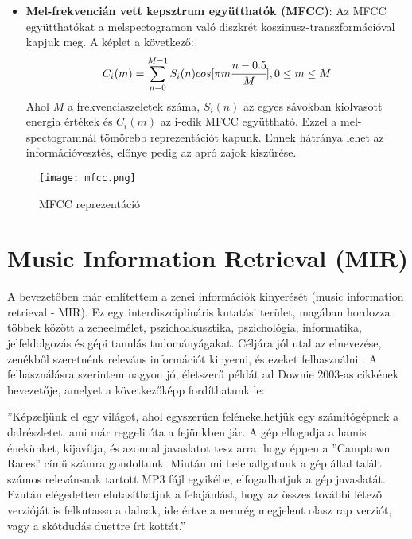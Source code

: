 \begin{itemize}
\item \textbf{Mel-frekvencián vett kepsztrum együtthatók (MFCC)}: Az MFCC együtthatókat a melspectogramon való diszkrét koszinusz-transzformációval kapjuk meg. A képlet a következő:
\begin{equation}
	C_i(m) =  \sum_{n=0}^{M-1}S_i(n) cos [\pi m\cfrac{n - 0.5}{M}], 0 \leq m \leq M
\end{equation}
Ahol \(M\) a frekvenciaszeletek száma, \(S_i(n)\) az egyes sávokban kiolvasott energia értékek és \(C_i(m)\) az i-edik MFCC együttható. Ezzel a mel-spectogramnál tömörebb reprezentációt kapunk. Ennek hátránya lehet az információvesztés, előnye pedig az apró zajok kiszűrése. \cite{bhalke2015}
\end{itemize}

\begin{figure}[H]
  \centering
  \texttt{[image: mfcc.png]}
  \caption{MFCC reprezentáció \cite{librosa}}
\end{figure}

\section{Music Information Retrieval (MIR)} 

A bevezetőben már említettem a zenei információk kinyerését (music information retrieval - MIR). Ez egy interdiszciplináris kutatási terület, magában hordozza többek között a zeneelmélet, pszichoakusztika, pszichológia, informatika, jelfeldolgozás és gépi tanulás tudományágakat. Céljára jól utal az elnevezése, zenékből szeretnénk releváns információt kinyerni, és ezeket felhasználni \cite{Choi2017}. A felhasználásra szerintem nagyon jó, életszerű példát ad Downie 2003-as cikkének \cite{Downie2003} bevezetője, amelyet a következőképp fordíthatunk le:

''Képzeljünk el egy világot, ahol egyszerűen felénekelhetjük egy számítógépnek a dalrészletet, ami már reggeli óta a fejünkben jár. A gép elfogadja a hamis énekünket, kijavítja, és azonnal javaslatot tesz arra, hogy éppen a ''Camptown Races'' című számra gondoltunk. Miután mi belehallgatunk a gép által talált számos relevánsnak tartott MP3 fájl egyikébe, elfogadhatjuk a gép javaslatát. Ezután elégedetten elutasíthatjuk a felajánlást, hogy az összes további létező verzióját is felkutassa a dalnak, ide értve a nemrég megjelent olasz rap verziót, vagy a skótdudás duettre írt kottát.''  \cite{Downie2003}

